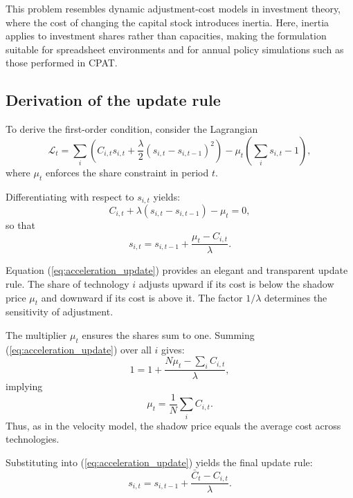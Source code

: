 \documentclass[preprint,authoryear,12pt]{elsarticle}
\begin{document}
This problem resembles dynamic adjustment-cost models in investment theory, where the cost of
changing the capital stock introduces inertia. Here, inertia applies to investment shares rather
than capacities, making the formulation suitable for spreadsheet environments and for annual
policy simulations such as those performed in CPAT.

\subsection{Derivation of the update rule}

To derive the first-order condition, consider the Lagrangian
\begin{equation}
    \mathcal{L}_t = \sum_i \left( C_{i,t} s_{i,t}
    + \frac{\lambda}{2} (s_{i,t} - s_{i,t-1})^2 \right)
    - \mu_t \left( \sum_i s_{i,t} - 1 \right),
\end{equation}
where $\mu_t$ enforces the share constraint in period $t$.

Differentiating with respect to $s_{i,t}$ yields:
\begin{equation}
    C_{i,t} + \lambda (s_{i,t} - s_{i,t-1}) - \mu_t = 0,
    \label{eq:acceleration_foc}
\end{equation}
so that
\begin{equation}
    s_{i,t} = s_{i,t-1} + \frac{\mu_t - C_{i,t}}{\lambda}.
    \label{eq:acceleration_update}
\end{equation}

Equation (\ref{eq:acceleration_update}) provides an elegant and transparent update rule. The
share of technology $i$ adjusts upward if its cost is below the shadow price $\mu_t$ and downward
if its cost is above it. The factor $1/\lambda$ determines the sensitivity of adjustment.

The multiplier $\mu_t$ ensures the shares sum to one. Summing
(\ref{eq:acceleration_update}) over all $i$ gives:
\begin{equation}
    1 = 1 + \frac{N \mu_t - \sum_i C_{i,t}}{\lambda},
\end{equation}
implying
\begin{equation}
    \mu_t = \frac{1}{N} \sum_i C_{i,t}.
\end{equation}
Thus, as in the velocity model, the shadow price equals the average cost across technologies.

Substituting into (\ref{eq:acceleration_update}) yields the final update rule:
\begin{equation}
    s_{i,t}
    = s_{i,t-1} 
    + \frac{\bar{C}_t - C_{i,t}}{\lambda}.
    \label{eq:s_final_acceleration}
\end{equation}
\end{document}
